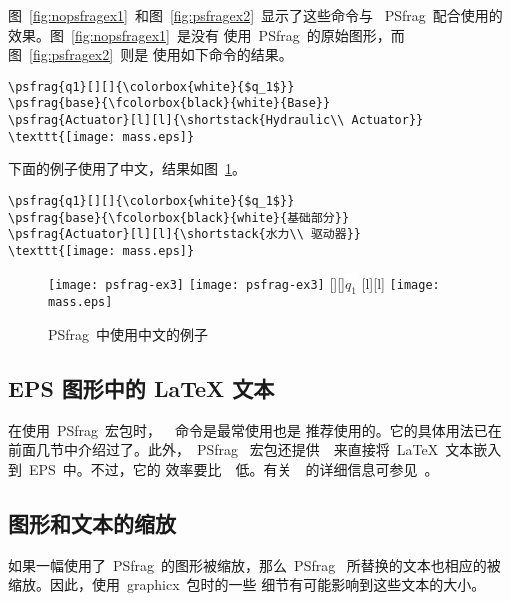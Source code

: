 图~\ref{fig:nopsfragex1}~和图~\ref{fig:psfragex2}~显示了这些命令与
~\textsf{PSfrag}~配合使用的效果。图~\ref{fig:nopsfragex1}~是没有
使用~\textsf{PSfrag}~的原始图形，而图~\ref{fig:psfragex2}~则是
使用如下命令的结果。
\begin{Verbatim}[xleftmargin=1cm]
\psfrag{q1}[][]{\colorbox{white}{$q_1$}}
\psfrag{base}{\fcolorbox{black}{white}{Base}}
\psfrag{Actuator}[l][l]{\shortstack{Hydraulic\\ Actuator}}
\texttt{[image: mass.eps]}
\end{Verbatim}

下面的例子使用了中文，结果如图~\ref{fig:psfragex3}。
\begin{Verbatim}[xleftmargin=1cm,formatcom=\color{VerbatimColor}\CJKfamily{kai}]
\psfrag{q1}[][]{\colorbox{white}{$q_1$}}
\psfrag{base}{\fcolorbox{black}{white}{基础部分}}
\psfrag{Actuator}[l][l]{\shortstack{水力\\ 驱动器}}
\texttt{[image: mass.eps]}
\end{Verbatim}

\begin{figure}
\ifpdf
\centering
\texttt{[image: psfrag-ex3]}
\else
\ifdvipdfm
\centering
\texttt{[image: psfrag-ex3]}
\else
{}[][]{\colorbox{white}{$q_1$}}
[l][l]{}
\centering
\texttt{[image: mass.eps]}
\fi
\fi
\caption{PSfrag~{中使用中文的例子}}\label{fig:psfragex3}
\end{figure}

\subsection{EPS 图形中的 \LaTeX{} 文本}\label{ssec:latextext}

在使用~\textsf{PSfrag}~宏包时，~~命令是最常使用也是
推荐使用的。它的具体用法已在前面几节中介绍过了。此外，~\textsf{PSfrag}~
宏包还提供~~来直接将~\LaTeX{}~文本嵌入到~EPS~中。不过，它的
效率要比~~低。有关~~的详细信息可参见~\cite{psfrag}。

\subsection{图形和文本的缩放}\label{ssec:psfragscale}

如果一幅使用了~\textsf{PSfrag}~的图形被缩放，那么~\textsf{PSfrag}~
所替换的文本也相应的被缩放。因此，使用~\textsf{graphicx}~包时的一些
细节有可能影响到这些文本的大小。

